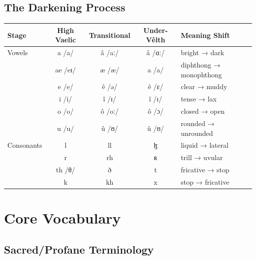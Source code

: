 \documentclass[11pt,a4paper,twoside]{book}
\begin{document}
\subsection{The Darkening Process}

\begin{center}
\begin{tabular}{|l|c|c|c|l|}
\hline
\textbf{Stage} & \textbf{High Vaelic} & \textbf{Transitional} & \textbf{Under-Vêlth} & \textbf{Meaning Shift} \\
\hline
Vowels & a /a/ & â /aː/ & â /ɑː/ & bright → dark \\
& ae /eɪ/ & æ /æ/ & a /a/ & diphthong → monophthong \\
& e /e/ & ê /ə/ & ê /ɛ/ & clear → muddy \\
& i /i/ & î /ɪ/ & î /ɪ/ & tense → lax \\
& o /o/ & ô /oː/ & ô /ɔ/ & closed → open \\
& u /u/ & û /ʊ/ & û /ʊ/ & rounded → unrounded \\
\hline
Consonants & l & ll & ɮ & liquid → lateral \\
& r & rh & ʀ & trill → uvular \\
& th /θ/ & ð & t & fricative → stop \\
& k & kh & x & stop → fricative \\
\hline
\end{tabular}
\end{center}

\section{Core Vocabulary}

\subsection{Sacred/Profane Terminology}
\end{document}
